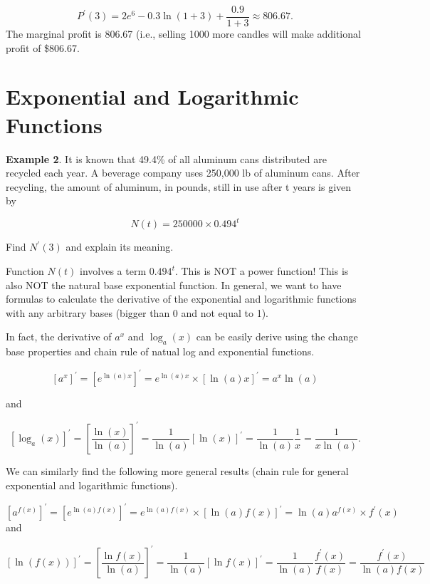 \documentclass[
]{book}
\begin{document}
\[
P^\prime(3) = 2e^6 - 0.3\ln(1+3) + \frac{0.9}{1+3} \approx 806.67.
\]
The marginal profit is 806.67 (i.e., selling 1000 more candles will make additional profit of \$806.67.

\hfill\break

\hypertarget{exponential-and-logarithmic-functions}{%
\section{Exponential and Logarithmic Functions}\label{exponential-and-logarithmic-functions}}

\textbf{Example 2}. It is known that 49.4\% of all aluminum cans distributed are recycled each year. A beverage company uses 250,000 lb of aluminum cans. After recycling, the amount of aluminum, in pounds, still in use after t years is given by

\[
N(t) = 250000\times 0.494^t
\]

Find \(N^\prime(3)\) and explain its meaning.

\hfill\break

Function \(N(t)\) involves a term \(0.494^t\). This is NOT a power function! This is also NOT the natural base exponential function. In general, we want to have formulas to calculate the derivative of the exponential and logarithmic functions with any arbitrary bases (bigger than 0 and not equal to 1).

In fact, the derivative of \(a^x\) and \(\log_a(x)\) can be easily derive using the change base properties and chain rule of natual log and exponential functions.

\[
[a^x]^\prime = [e^{\ln(a)x}]^\prime = e^{\ln(a) x}\times[\ln(a)x]^\prime = a^x\ln(a)
\]

and

\[
[\log_a(x)]^\prime = \left[ \frac{\ln(x)}{\ln(a)}\right]^\prime = \frac{1}{\ln(a)}[\ln(x)]^\prime = \frac{1}{\ln(a)}\frac{1}{x} = \frac{1}{x\ln(a)}.
\]

We can similarly find the following more general results (chain rule for general exponential and logarithmic functions).

\[
\left[a^{f(x)}\right]^\prime =\left[e^{\ln(a)f(x)}\right]^\prime  = e^{\ln(a)f(x)}\times [\ln(a)f(x)]^\prime =\ln(a) a^{f(x)}\times f^\prime(x) 
\]
and

\[
[\ln(f(x))]^\prime = \left[ \frac{\ln f(x)}{\ln(a)}\right]^\prime = \frac{1}{\ln(a)}[\ln f(x)]^\prime = \frac{1}{\ln(a)}\frac{f^\prime(x)}{f(x)} = \frac{f^\prime(x)}{\ln(a)f(x)}
\]
\end{document}
